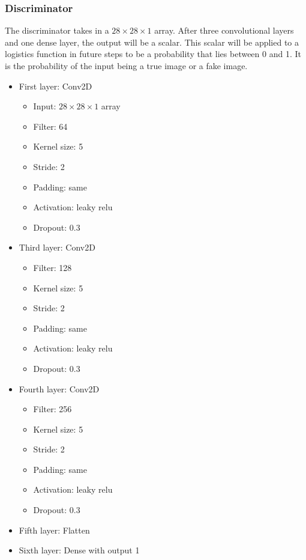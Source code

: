 \documentclass{article}
\begin{document}
\subsubsection{Discriminator}

The discriminator takes in a $28\times 28\times 1$ array. After three convolutional layers and one dense layer, the output will be a scalar.
This scalar will be applied to a logistics function in future steps to be a probability that lies between 0 and 1. It is the probability of the input being a true image or a fake image.

\begin{itemize}
  \item First layer: Conv2D
    \begin{itemize}
      \item Input: $28 \times 28\times 1$ array
      \item Filter: 64
      \item Kernel size: 5
      \item Stride: 2
      \item Padding: same
      \item Activation: leaky relu
      \item Dropout: 0.3
  \end{itemize} 
  \item Third layer: Conv2D
    \begin{itemize}
      \item Filter: 128
      \item Kernel size: 5
      \item Stride: 2
      \item Padding: same
      \item Activation: leaky relu
      \item Dropout: 0.3
    \end{itemize}   
  \item Fourth layer: Conv2D
    \begin{itemize}
      \item Filter: 256
      \item Kernel size: 5
      \item Stride: 2
      \item Padding: same
      \item Activation: leaky relu
      \item Dropout: 0.3
    \end{itemize} 
  \item Fifth layer: Flatten
  \item Sixth layer: Dense with output 1
\end{itemize}
\end{document}
